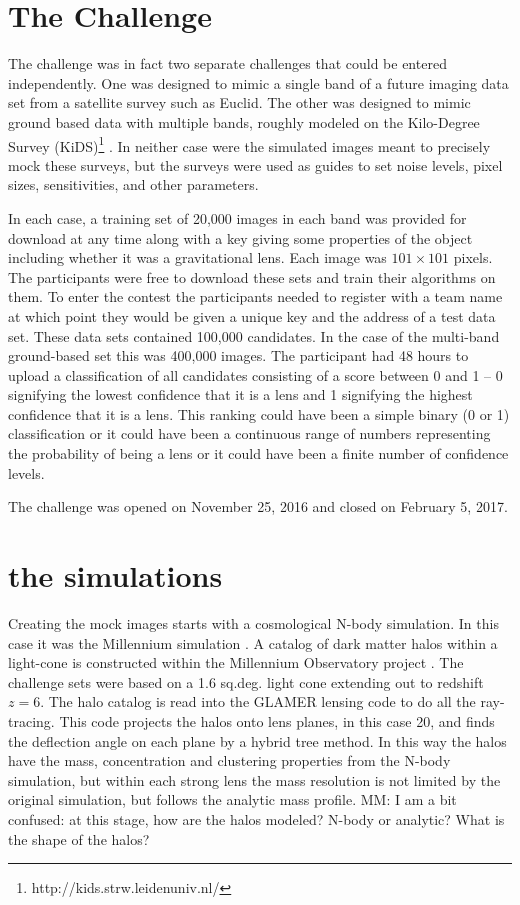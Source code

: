 \documentclass[useAMS,usenatbib]{mnras}
\begin{document}
\section{The Challenge}
\label{sec:challenge}

The challenge was in fact two separate challenges that could be entered independently.  One was designed to mimic a single band of a future imaging data set from a satellite survey such as Euclid.  The other was designed to mimic ground based data with multiple bands, roughly modeled on the Kilo-Degree Survey (KiDS)\footnote{http://kids.strw.leidenuniv.nl/} \citep{2013ExA....35...25D}. In neither case were the simulated images meant to precisely mock these surveys, but the surveys were used as guides to set noise levels, pixel sizes, sensitivities, and other parameters.

In each case, a training set of 20,000 images in each band was provided for download at any time along with a key giving some properties of the object including whether it was a gravitational lens.  Each image was $101\times101$ pixels.  The participants were free to download these sets and train their algorithms on them.  To enter the contest the participants needed to register with a team name at which point they would be given a unique key and the address of a test data set.  These data sets contained 100,000 candidates.  In the case of the multi-band ground-based set this was 400,000 images. The participant had 48 hours to upload a classification of all candidates consisting of a score between 0 and 1 -- 0 signifying the lowest confidence that it is a lens and 1 signifying the highest confidence that it is a lens.  This ranking could have been a simple binary (0 or 1) classification  or it could have been a continuous range of numbers representing the probability of being a lens or it could have been a finite number of confidence levels.  

The challenge was opened on November 25, 2016 and closed on February 5, 2017.

\section{the simulations}
\label{sec:simulation}

Creating the mock images starts with a cosmological N-body simulation.  In this case it was the Millennium simulation \citep{2009MNRAS.398.1150B}.   A catalog of dark matter halos within a light-cone is constructed within the Millennium Observatory project \citep{2013MNRAS.428..778O}.   The challenge sets were based on a 1.6 sq.deg. light cone extending out to redshift $z=6$.
The halo catalog is read into the GLAMER lensing code \citep{2014MNRAS.445.1942M,2014MNRAS.445.1954P} to do all the ray-tracing.  This code projects the halos onto lens planes, in this case 20, and finds the deflection angle on each plane by a hybrid tree method.  In this way the halos have the mass, concentration and clustering properties from the N-body simulation, but within each strong lens the mass resolution is not limited by the original simulation, but follows the analytic mass profile. {\color{red} MM: I am a bit confused: at this stage, how are the halos modeled? N-body or analytic? What is the shape of the halos?} 
\end{document}
